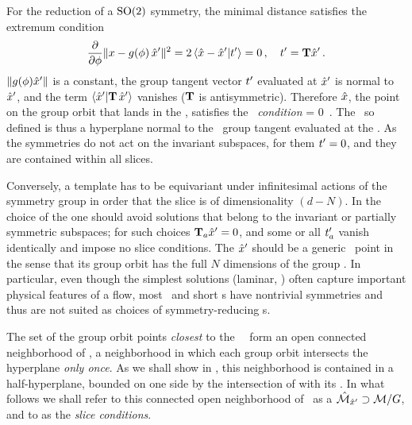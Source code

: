 For the reduction of a $\textrm{SO}(2)$ symmetry, the minimal distance satisfies
the extremum condition
\[
\frac{\partial}{\partial \gSpace} \Norm{\ssp - \LieEl(\gSpace)\,\slicep}^2
   =
2\, \braket{\sspRed - \slicep}{\sliceTan{}}
   = 0
        \,,\quad
\sliceTan{} = \Lg \slicep
\,.
\]
$\|{g({\bf \phi}){\hat{x}'}}\|$ is a constant, the group tangent vector
$t'_{}$ evaluated at ${\hat{x}'}$  is normal to
${\hat{x}'}$, and the term $\braket{\slicep}{\Lg \,\slicep}$ vanishes ($\mathbf{T}$
is antisymmetric). Therefore  $\hat{x}$, the point on the group orbit that
lands in the \slice, satisfies the \emph{\slice\ condition}
\beq
\braket{\sspRed}{\sliceTan{}} = 0
    \,.
The \slice\ so defined is thus a hyperplane
normal to the \template\ group tangent evaluated at the \template.
As the symmetries do not act on the invariant subspaces, for them
$t'_{} = 0$, and they are contained within all slices.

Conversely,
a template has to be equivariant under infinitesimal actions of the symmetry
group in order that the slice is of dimensionality $(d-N)$.
In the choice of the {\template} one should avoid solutions
that belong to the invariant or partially symmetric subspaces; for such
choices $\mathbf{T}_{a}{\hat{x}'}=0$, and some or all $t'_{a}$ vanish identically
and impose no slice conditions. The {\template} ${\hat{x}'}$ should be a
generic \statesp\ point in the sense that its group orbit has the full
$N$ dimensions of the group \Group. In particular, even though the
simplest solutions (laminar, \etc) often capture important physical
features of a flow, most \eqva\ and short \po s have nontrivial
symmetries and thus are not suited as choices of symmetry-reducing
{\template s}.

The set of the group orbit points \emph{closest} to the \template\ \slicep\
form an open connected neighborhood
of \slicep, a neighborhood in which each group orbit intersects the
hyperplane \emph{only once}.
As we shall show in , this neighborhood is contained in
a half-hyperplane, bounded on one side by the intersection of 
with its {\chartBord}.
In what follows we shall refer to this connected open neighborhood
of \slicep\ as a \emph{\slice} $\hat{\cal M}_{{\hat{x}'}} \supset {\cal M}/G$,
and
to   as the \emph{slice conditions}.


